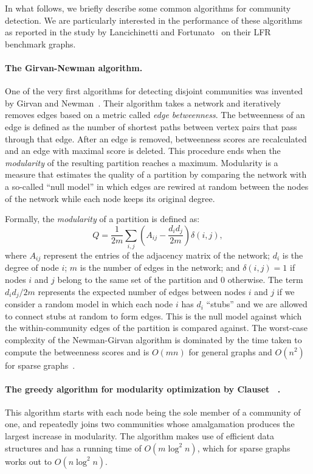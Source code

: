 In what follows, we briefly describe some common algorithms 
for community detection. We are particularly interested in the performance 
of these algorithms as reported in the study by Lancichinetti and 
Fortunato~\cite{LF09} on their LFR benchmark graphs. 

\paragraph{The Girvan-Newman algorithm.} 
One of the very first algorithms for detecting disjoint communities 
was invented by Girvan and Newman~\cite{GN02, GN04}. Their 
algorithm takes a network and iteratively removes edges based 
on a metric called \emph{edge betweenness}. The betweenness of an 
edge is defined as the number of shortest paths between vertex pairs 
that pass through that edge. After an edge is removed, betweenness 
scores are recalculated and an edge with maximal score is deleted. 
This procedure ends when the \textit{modularity} of the resulting partition
reaches a maximum. Modularity is a measure that estimates the quality 
of a partition by comparing the network with a so-called ``null model''
in which edges are rewired at random between the nodes of the network 
while each node keeps its original degree.

Formally, the \emph{modularity} of a partition is defined as:
%
\begin{equation}\label{eqn:modularity}
	Q = \frac{1}{2m} \sum_{i, j} \left ( A_{i j} - \frac{d_i d_j}{2m} \right ) \delta(i, j),
\end{equation}
%
where $A_{ij}$ represent the entries of the adjacency matrix of the network; $d_i$ is the 
degree of node $i$; $m$ is the number of edges in the network; and $\delta(i, j) = 1$ if nodes
$i$ and $j$ belong to the same set of the partition and $0$ otherwise. The term $d_i d_j / 2m$ 
represents the expected number of edges between nodes $i$ and $j$ if we consider a random model
in which each node $i$ has $d_i$ ``stubs'' and we are allowed to connect stubs at random to form edges. 
This is the null model against which the within-community edges of the partition is compared against.
The worst-case complexity of the Newman-Girvan algorithm is dominated by the time taken 
to compute the betweenness scores and is $O(m n)$ for general graphs and $O(n^2)$ for sparse 
graphs~\cite{Bra01}.

\paragraph{The greedy algorithm for modularity optimization by Clauset \etal~\cite{CNM04}.}
This algorithm starts with each node being the sole member of a community of one, and 
repeatedly joins two communities whose amalgamation produces the largest increase in modularity. 
The algorithm makes use of efficient data structures and has a running time of $O(m \log^2 n)$, 
which for sparse graphs works out to $O(n \log^2 n)$. 

